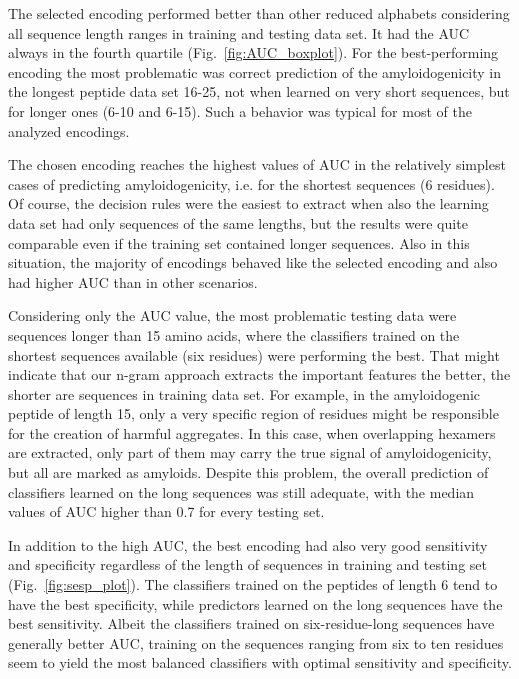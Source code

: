 \documentclass[a4,center,fleqn]{NAR}
\begin{document}
The selected encoding performed better than other reduced alphabets considering 
all sequence length ranges in training and testing data set. It had the AUC
always in the fourth quartile (Fig.~\ref{fig:AUC_boxplot}). For the 
best-performing encoding the most problematic was correct prediction of the 
amyloidogenicity in the longest peptide data set 16-25, not when learned on very 
short sequences, but for longer ones (6-10 and 6-15). Such a behavior was 
typical for most of the analyzed encodings.

  The chosen encoding reaches the highest values of AUC in the relatively 
simplest cases of predicting amyloidogenicity, i.e. for the shortest sequences (6 
residues). Of course, the decision rules were the easiest to extract when also 
the learning data set had only sequences of the same lengths, but the results 
were quite comparable even if the training set contained longer sequences. Also 
in this situation, the majority of encodings behaved like the 
selected encoding and also had higher AUC than in other scenarios.

  Considering only the AUC value, the most problematic testing data were 
sequences longer than 15 amino acids, where the classifiers trained on the 
shortest sequences available (six residues) were performing the best. That might 
indicate that our n-gram approach extracts the important features the better, 
the shorter are sequences in training data set. For example, in the 
amyloidogenic peptide of length 15, only a very specific region of residues 
might be responsible for the creation of harmful aggregates. In this case, when 
overlapping hexamers are extracted, only part of them may carry the true signal 
of amyloidogenicity, but all are marked as amyloids. Despite this problem, the 
overall prediction of classifiers learned on the long sequences was still 
adequate, with the median values of AUC higher than 0.7 for every testing set. 

  In addition to the high AUC, the best encoding had also very good sensitivity 
and specificity regardless of the length of sequences in training and testing 
set (Fig.~\ref{fig:sesp_plot}). The classifiers trained on the peptides of 
length 6 tend to have the best specificity, while predictors learned on the long 
sequences have the best sensitivity. Albeit the classifiers trained on 
six-residue-long sequences have generally better AUC, training on the sequences 
ranging from six to ten residues seem to yield the most balanced classifiers 
with optimal sensitivity and specificity.
\end{document}
